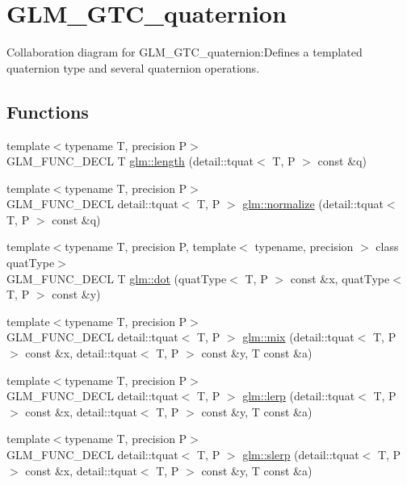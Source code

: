 \hypertarget{group__gtc__quaternion}{
\section{GLM\_\-GTC\_\-quaternion}
\label{group__gtc__quaternion}
}


Collaboration diagram for GLM\_\-GTC\_\-quaternion:Defines a templated quaternion type and several quaternion operations.  
\subsection*{Functions}
\begin{CompactItemize}
\item 
{\footnotesize template$<$typename T, precision P$>$ }\\GLM\_\-FUNC\_\-DECL T \hyperlink{group__gtc__quaternion_g286560b01bedb4e046ffb71de22464f4}{glm::length} (detail::tquat$<$ T, P $>$ const \&q)
\item 
{\footnotesize template$<$typename T, precision P$>$ }\\GLM\_\-FUNC\_\-DECL detail::tquat$<$ T, P $>$ \hyperlink{group__gtc__quaternion_g396b587a47d7e611895b2c95892a2e17}{glm::normalize} (detail::tquat$<$ T, P $>$ const \&q)
\item 
{\footnotesize template$<$typename T, precision P, template$<$ typename, precision $>$ class quatType$>$ }\\GLM\_\-FUNC\_\-DECL T \hyperlink{group__gtc__quaternion_g4ce8bce2b7dc8206a31cfb8e7b779b76}{glm::dot} (quatType$<$ T, P $>$ const \&x, quatType$<$ T, P $>$ const \&y)
\item 
{\footnotesize template$<$typename T, precision P$>$ }\\GLM\_\-FUNC\_\-DECL detail::tquat$<$ T, P $>$ \hyperlink{group__gtc__quaternion_gd53916e67eedc8bb259548504b713350}{glm::mix} (detail::tquat$<$ T, P $>$ const \&x, detail::tquat$<$ T, P $>$ const \&y, T const \&a)
\item 
{\footnotesize template$<$typename T, precision P$>$ }\\GLM\_\-FUNC\_\-DECL detail::tquat$<$ T, P $>$ \hyperlink{group__gtc__quaternion_g7bdb11ee6bfad4eafe2cb71337353ca4}{glm::lerp} (detail::tquat$<$ T, P $>$ const \&x, detail::tquat$<$ T, P $>$ const \&y, T const \&a)
\item 
{\footnotesize template$<$typename T, precision P$>$ }\\GLM\_\-FUNC\_\-DECL detail::tquat$<$ T, P $>$ \hyperlink{group__gtc__quaternion_ga75cee4315cd8e7f15eaac3ea944106a}{glm::slerp} (detail::tquat$<$ T, P $>$ const \&x, detail::tquat$<$ T, P $>$ const \&y, T const \&a)

\end{CompactItemize}
